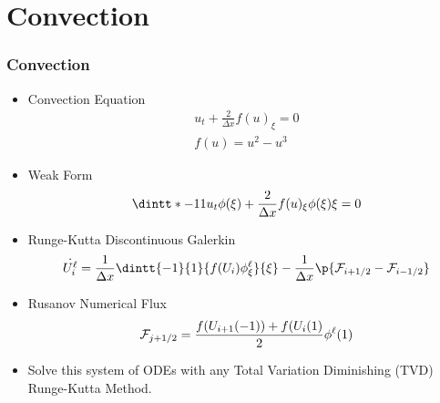 \documentclass[10pt]{beamer}
\begin{document}
  \section{Convection}
    \begin{frame}
      \frametitle{Convection}
      \begin{itemize}
        \item Convection Equation
          \begin{gather*}
            u_t + \frac{2}{\Delta x} f(u)_\xi = 0 \\
            f(u) = u^2 - u^3
          \end{gather*}

        \item Weak Form
          \[
            \dintt*{-1}{1}{u_t \phi(\xi) + \frac{2}{\Delta x}f(u)_\xi \phi(\xi)}{\xi} = 0
          \]

        \item Runge-Kutta Discontinuous Galerkin
          \[
            \dot{U_i^{\ell}} = \frac{1}{\Delta x}\dintt{-1}{1}{f(U_i)\phi_{\xi}^{\ell}}{\xi} - \frac{1}{\Delta x} \p{\mcF_{i + 1/2} - \mcF_{i - 1/2}}
          \]

        \item Rusanov Numerical Flux
          \[
            \mathcal{F}_{j+1/2} = \frac{f(U_{i+1}(-1)) + f(U_{i}(1)}{2} \phi^{\ell}(1)
          \]

        \item Solve this system of ODEs with any Total Variation Diminishing (TVD) Runge-Kutta Method.
      \end{itemize}
    \end{frame}
\end{document}
